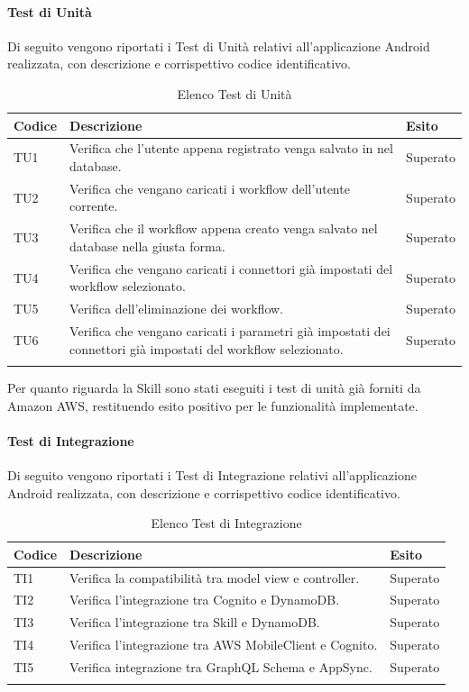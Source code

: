 \paragraph{Test di Unità}
\label{sec:tuRQ}
Di seguito vengono riportati i Test di Unità relativi all'applicazione Android realizzata, con descrizione e corrispettivo codice identificativo.
\begin{center}
	\centering
	\renewcommand{\arraystretch}{1.5}
	\begin{longtable}{  p{1.5cm}  p{10.5cm} p{2cm}  }
		\rowcolor{tableHeadYellow}
		\textbf{Codice}   & \textbf{Descrizione} & \textbf{Esito} \\ 
		\endhead
		TU1 & Verifica che l’utente appena registrato venga salvato in nel database.  & Superato \\
		TU2 & Verifica che vengano caricati i workflow dell’utente corrente. & Superato \\
		TU3 & Verifica che il workflow appena creato venga salvato nel database nella giusta forma. & Superato \\
		TU4 & Verifica che vengano caricati i connettori già impostati del workflow selezionato. & Superato \\
		TU5 & Verifica dell’eliminazione dei workflow. & Superato \\
		TU6 & Verifica che vengano caricati i parametri già impostati dei connettori già impostati del workflow selezionato. & Superato \\
		\rowcolor{white}
		\caption{Elenco Test di Unità}
	\end{longtable}
\end{center}
Per quanto riguarda la Skill sono stati eseguiti i test di unità già forniti da Amazon AWS, restituendo esito positivo per le funzionalità implementate.
\paragraph{Test di Integrazione}
\label{sec:tiRQ}
Di seguito vengono riportati i Test di Integrazione relativi all'applicazione Android realizzata, con descrizione e corrispettivo codice identificativo.
\begin{center}
	\centering
	\renewcommand{\arraystretch}{1.5}
	\begin{longtable}{  p{1.5cm}  p{10.5cm} p{2cm}  }
		\rowcolor{tableHeadYellow}
		\textbf{Codice}   & \textbf{Descrizione} & \textbf{Esito} \\ 
		\endhead
		TI1 & Verifica la compatibilità tra model view e controller.  & Superato \\
		TI2 & Verifica l’integrazione tra Cognito e DynamoDB. & Superato \\
		TI3 & Verifica l’integrazione tra Skill e DynamoDB. & Superato \\
		TI4 & Verifica l’integrazione tra AWS MobileClient e Cognito. & Superato \\
		TI5 & Verifica integrazione tra GraphQL Schema e AppSync. & Superato \\
		\rowcolor{white}
		\caption{Elenco Test di Integrazione}
	\end{longtable}
\end{center}
